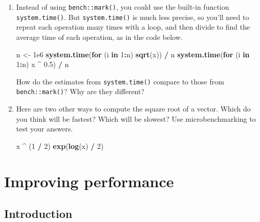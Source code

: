 \documentclass[]{book}
\newenvironment{Shaded}{\begin{snugshade}}{\end{snugshade}}
\newcommand{\ControlFlowTok}[1]{\textcolor[rgb]{0.27,0.27,0.27}{\textbf{#1}}}
\newcommand{\DecValTok}[1]{\textcolor[rgb]{0.06,0.06,0.06}{#1}}
\newcommand{\FloatTok}[1]{\textcolor[rgb]{0.06,0.06,0.06}{#1}}
\newcommand{\KeywordTok}[1]{\textcolor[rgb]{0.27,0.27,0.27}{\textbf{#1}}}
\newcommand{\NormalTok}[1]{#1}
\newcommand{\OperatorTok}[1]{\textcolor[rgb]{0.43,0.43,0.43}{\textbf{#1}}}
\newcommand{\StringTok}[1]{\textcolor[rgb]{0.5,0.5,0.5}{#1}}
\begin{document}
\begin{enumerate}
\def\labelenumi{\arabic{enumi}.}
\item
  Instead of using \texttt{bench::mark()}, you could use the built-in function
  \texttt{system.time()}. But \texttt{system.time()} is much less precise, so you'll
  need to repeat each operation many times with a loop, and then divide
  to find the average time of each operation, as in the code below.

\begin{Shaded}
\begin{Highlighting}[]
\NormalTok{n <-}\StringTok{ }\FloatTok{1e6}
\KeywordTok{system.time}\NormalTok{(}\ControlFlowTok{for}\NormalTok{ (i }\ControlFlowTok{in} \DecValTok{1}\OperatorTok{:}\NormalTok{n) }\KeywordTok{sqrt}\NormalTok{(x)) }\OperatorTok{/}\StringTok{ }\NormalTok{n}
\KeywordTok{system.time}\NormalTok{(}\ControlFlowTok{for}\NormalTok{ (i }\ControlFlowTok{in} \DecValTok{1}\OperatorTok{:}\NormalTok{n) x }\OperatorTok{^}\StringTok{ }\FloatTok{0.5}\NormalTok{) }\OperatorTok{/}\StringTok{ }\NormalTok{n}
\end{Highlighting}
\end{Shaded}

  How do the estimates from \texttt{system.time()} compare to those from
  \texttt{bench::mark()}? Why are they different?
\item
  Here are two other ways to compute the square root of a vector. Which
  do you think will be fastest? Which will be slowest? Use microbenchmarking
  to test your answers.

\begin{Shaded}
\begin{Highlighting}[]
\NormalTok{x }\OperatorTok{^}\StringTok{ }\NormalTok{(}\DecValTok{1} \OperatorTok{/}\StringTok{ }\DecValTok{2}\NormalTok{)}
\KeywordTok{exp}\NormalTok{(}\KeywordTok{log}\NormalTok{(x) }\OperatorTok{/}\StringTok{ }\DecValTok{2}\NormalTok{)}
\end{Highlighting}
\end{Shaded}
\end{enumerate}

\hypertarget{perf-improve}{%
\chapter{Improving performance}\label{perf-improve}}

\hypertarget{introduction-7}{%
\section{Introduction}\label{introduction-7}}
\end{document}
